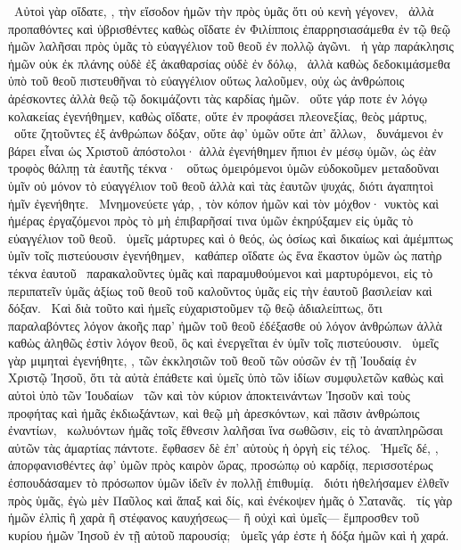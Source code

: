 ~Αὐτοὶ γὰρ οἴδατε, , τὴν εἴσοδον ἡμῶν τὴν πρὸς ὑμᾶς ὅτι οὐ κενὴ γέγονεν,
~ἀλλὰ προπαθόντες καὶ ὑβρισθέντες καθὼς οἴδατε ἐν Φιλίπποις ἐπαρρησιασάμεθα ἐν τῷ θεῷ ἡμῶν λαλῆσαι πρὸς ὑμᾶς τὸ εὐαγγέλιον τοῦ θεοῦ ἐν πολλῷ ἀγῶνι.
~ἡ γὰρ παράκλησις ἡμῶν οὐκ ἐκ πλάνης οὐδὲ ἐξ ἀκαθαρσίας οὐδὲ ἐν δόλῳ,
~ἀλλὰ καθὼς δεδοκιμάσμεθα ὑπὸ τοῦ θεοῦ πιστευθῆναι τὸ εὐαγγέλιον οὕτως λαλοῦμεν, οὐχ ὡς ἀνθρώποις ἀρέσκοντες ἀλλὰ θεῷ τῷ δοκιμάζοντι τὰς καρδίας ἡμῶν.
~οὔτε γάρ ποτε ἐν λόγῳ κολακείας ἐγενήθημεν, καθὼς οἴδατε, οὔτε ἐν προφάσει πλεονεξίας, θεὸς μάρτυς,
~οὔτε ζητοῦντες ἐξ ἀνθρώπων δόξαν, οὔτε ἀφ’ ὑμῶν οὔτε ἀπ’ ἄλλων,
~δυνάμενοι ἐν βάρει εἶναι ὡς Χριστοῦ ἀπόστολοι· ἀλλὰ ἐγενήθημεν ἤπιοι ἐν μέσῳ ὑμῶν, ὡς ἐὰν τροφὸς θάλπῃ τὰ ἑαυτῆς τέκνα·
~οὕτως ὁμειρόμενοι ὑμῶν εὐδοκοῦμεν μεταδοῦναι ὑμῖν οὐ μόνον τὸ εὐαγγέλιον τοῦ θεοῦ ἀλλὰ καὶ τὰς ἑαυτῶν ψυχάς, διότι ἀγαπητοὶ ἡμῖν ἐγενήθητε.
~Μνημονεύετε γάρ, , τὸν κόπον ἡμῶν καὶ τὸν μόχθον· νυκτὸς καὶ ἡμέρας ἐργαζόμενοι πρὸς τὸ μὴ ἐπιβαρῆσαί τινα ὑμῶν ἐκηρύξαμεν εἰς ὑμᾶς τὸ εὐαγγέλιον τοῦ θεοῦ.
~ὑμεῖς μάρτυρες καὶ ὁ θεός, ὡς ὁσίως καὶ δικαίως καὶ ἀμέμπτως ὑμῖν τοῖς πιστεύουσιν ἐγενήθημεν,
~καθάπερ οἴδατε ὡς ἕνα ἕκαστον ὑμῶν ὡς πατὴρ τέκνα ἑαυτοῦ
~παρακαλοῦντες ὑμᾶς καὶ παραμυθούμενοι καὶ μαρτυρόμενοι, εἰς τὸ περιπατεῖν ὑμᾶς ἀξίως τοῦ θεοῦ τοῦ καλοῦντος ὑμᾶς εἰς τὴν ἑαυτοῦ βασιλείαν καὶ δόξαν.
~Καὶ διὰ τοῦτο καὶ ἡμεῖς εὐχαριστοῦμεν τῷ θεῷ ἀδιαλείπτως, ὅτι παραλαβόντες λόγον ἀκοῆς παρ’ ἡμῶν τοῦ θεοῦ ἐδέξασθε οὐ λόγον ἀνθρώπων ἀλλὰ καθὼς ἀληθῶς ἐστὶν λόγον θεοῦ, ὃς καὶ ἐνεργεῖται ἐν ὑμῖν τοῖς πιστεύουσιν.
~ὑμεῖς γὰρ μιμηταὶ ἐγενήθητε, , τῶν ἐκκλησιῶν τοῦ θεοῦ τῶν οὐσῶν ἐν τῇ Ἰουδαίᾳ ἐν Χριστῷ Ἰησοῦ, ὅτι τὰ αὐτὰ ἐπάθετε καὶ ὑμεῖς ὑπὸ τῶν ἰδίων συμφυλετῶν καθὼς καὶ αὐτοὶ ὑπὸ τῶν Ἰουδαίων
~τῶν καὶ τὸν κύριον ἀποκτεινάντων Ἰησοῦν καὶ τοὺς προφήτας καὶ ἡμᾶς ἐκδιωξάντων, καὶ θεῷ μὴ ἀρεσκόντων, καὶ πᾶσιν ἀνθρώποις ἐναντίων,
~κωλυόντων ἡμᾶς τοῖς ἔθνεσιν λαλῆσαι ἵνα σωθῶσιν, εἰς τὸ ἀναπληρῶσαι αὐτῶν τὰς ἁμαρτίας πάντοτε. ἔφθασεν δὲ ἐπ’ αὐτοὺς ἡ ὀργὴ εἰς τέλος.
~Ἡμεῖς δέ, , ἀπορφανισθέντες ἀφ’ ὑμῶν πρὸς καιρὸν ὥρας, προσώπῳ οὐ καρδίᾳ, περισσοτέρως ἐσπουδάσαμεν τὸ πρόσωπον ὑμῶν ἰδεῖν ἐν πολλῇ ἐπιθυμίᾳ.
~διότι ἠθελήσαμεν ἐλθεῖν πρὸς ὑμᾶς, ἐγὼ μὲν Παῦλος καὶ ἅπαξ καὶ δίς, καὶ ἐνέκοψεν ἡμᾶς ὁ Σατανᾶς.
~τίς γὰρ ἡμῶν ἐλπὶς ἢ χαρὰ ἢ στέφανος καυχήσεως— ἢ οὐχὶ καὶ ὑμεῖς— ἔμπροσθεν τοῦ κυρίου ἡμῶν Ἰησοῦ ἐν τῇ αὐτοῦ παρουσίᾳ;
~ὑμεῖς γάρ ἐστε ἡ δόξα ἡμῶν καὶ ἡ χαρά.

